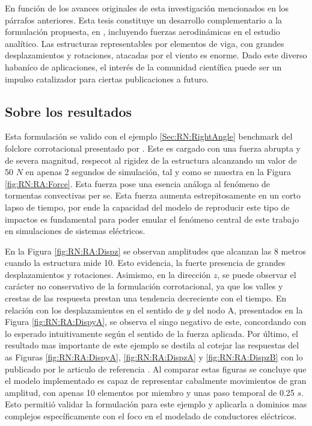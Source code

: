 En función de los avances originales de esta investigación mencionados en los párrafos anteriores. Esta tesis constituye un desarrollo complementario a la formulación propuesta, en \citep{Le2014}, incluyendo fuerzas aerodinámicas en el estudio analítico. Las estructuras representables por elementos de viga, con grandes desplazamientos y rotaciones, atacadas por el viento es enorme. Dado este diverso habaníco de aplicaciones, el interés de la comunidad científica puede ser un impulso catalizador para ciertas publicaciones a futuro.


\subsection{Sobre los resultados}

Esta formulación se valido con el ejemplo \ref{Sec:RN:RightAngle} benchmark del folclore corrotacional presentado por \cite{simo1988dynamics}. Este es cargado con una fuerza abrupta y de severa magnitud, respecot al  rigidez de la estructura alcanzando un valor de 50 $N$ en apenas 2 segundos de simulación, tal y como se muestra en la Figura \ref{fig:RN:RA:Force}. Esta fuerza pose una esencia análoga al fenómeno de tormentas convectivas per se. Esta fuerza aumenta estrepitosamente en un corto lapso de tiempo, por ende la capacidad del modelo de reproducir este tipo de impactos es fundamental para poder emular el fenómeno central de este trabajo en simulaciones de sistemas eléctricos.

 En la Figura \ref{fig:RN:RA:Dispz} se observan amplitudes que alcanzan las 8 metros cuando la estructura mide 10. Esto evidencia, la fuerte presencia de grandes desplazamientos y rotaciones. Asimismo, en la dirección $z$, se puede observar el carácter no conservativo de la formulación corrotacional, ya que los valles y crestas de las respuesta prestan una tendencia decreciente con el tiempo. En relación con los desplazamientos en el sentido de $y$ del nodo A, presentados en la Figura \ref{fig:RN:RA:DispyA}, se observa el singo negativo de este, concordando con lo esperado intuitivamente según el sentido de la fuerza aplicada. Por último, el resultado mas importante de este ejemplo se destila al cotejar las respuestas del as Figuras \ref{fig:RN:RA:DispyA}, \ref{fig:RN:RA:DispzA} y \ref{fig:RN:RA:DispzB} con lo publicado por le articulo de referencia \citep{Le2014}. Al comparar estas figuras se concluye que el modelo implementado es capaz de representar cabalmente movimientos de gran amplitud, con apenas 10 elementos por miembro y unas paso temporal de 0.25 $s$. Esto permitió validar la formulación para este ejemplo y aplicarla a dominios mas complejos específicamente con el foco en el modelado de conductores eléctricos. 

